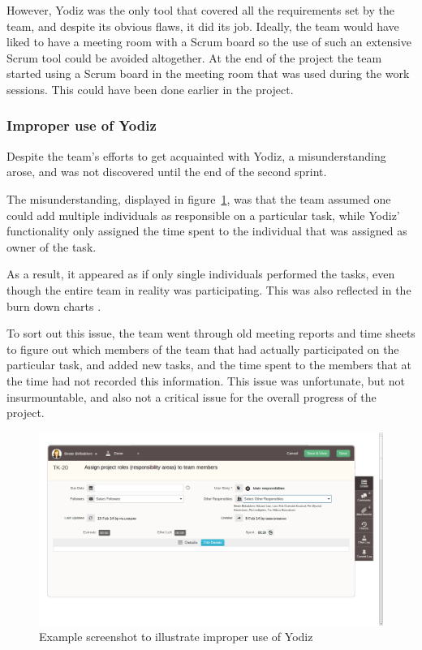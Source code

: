 However, Yodiz was the only tool that covered all the requirements set by the team, and despite its obvious flaws, it did its job. Ideally, the team would have liked to have a meeting room with a Scrum board so the use of such an extensive Scrum tool could be avoided altogether. At the end of the project the team started using a Scrum board in the meeting room that was used during the work sessions. This could have been done earlier in the project.


\subsubsection{Improper use of Yodiz}
\label{sec:improperScrum}
Despite the team's efforts to get acquainted with Yodiz, a misunderstanding arose, and was not discovered until the end of the second sprint.

The misunderstanding, displayed in figure~\ref{fig:wrongUse}, was that the team
assumed one could add multiple individuals as responsible on a particular task,
while Yodiz' functionality only assigned the time spent to the individual that was assigned as owner of the task.

As a result, it appeared as if only single individuals performed the tasks,
even though the entire team in reality was participating. This was also
reflected in the burn down charts . 

To sort out this issue, the team went through old meeting reports and time sheets
to figure out which members of the team that had actually participated on the
particular task, and added new tasks, and the time spent to the members that at
the time had not recorded this information.%
This issue was unfortunate, but not insurmountable, and also not a critical
issue for the overall progress of the project.

\begin{figure}[H]
\includegraphics[width=\textwidth, clip, trim=1cm 2cm 4cm 1cm]{ch/retrospect/fig/wrongUse.png}
\caption{Example screenshot to illustrate improper use of Yodiz}
\label{fig:wrongUse}
\end{figure}
